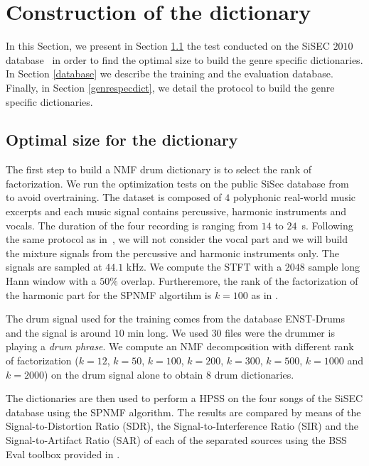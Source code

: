 \documentclass{article}
\begin{document}
\section{Construction of the dictionary}\label{ConstrucDict}

In this Section, we present in Section \ref{optimalsize} the test conducted on the SiSEC $2010$ database~\cite{SiSec10} in order to find the optimal size to build the genre specific dictionaries. In Section \ref{database} we describe the training and the evaluation database. Finally, in Section \ref{genrespecdict}, we detail the protocol to build the genre specific dictionaries. 

\subsection{Optimal size for the dictionary}\label{optimalsize}

The first step to build a NMF drum dictionary is to select the rank of factorization. We run the optimization tests on the public SiSec database from~\cite{SiSec10} to avoid overtraining. The dataset is composed of $4$ polyphonic real-world music excerpts and each music signal contains percussive, harmonic instruments and vocals. The duration of the four recording is ranging from $14$ to $24$~s. Following the same protocol as in~\cite{canadas2014percussive}, we will not consider the vocal part and we will build the mixture signals from the percussive and harmonic instruments only. The signals are sampled at $44.1$ kHz. We compute the STFT with a $2048$ sample long Hann window with a $50\%$ overlap. Furtheremore, the rank of the factorization of the harmonic part for the SPNMF algortihm is $k=100$ as in \cite{larocheJournal}.

The drum signal used for the training comes from the database ENST-Drums \cite{gillet2006enst} and the signal is around $10$ min long. We used $30$ files were the drummer is playing a \emph{drum phrase}. We compute an NMF decomposition with different rank of factorization ($k=12$, $k=50$, $k=100$, $k=200$, $k=300$, $k=500$, $k=1000$ and $k=2000$) on the drum signal alone to obtain $8$ drum dictionaries.

The dictionaries are then used to perform a HPSS on the four songs of the SiSEC database using the SPNMF algorithm. The results are compared by means of the Signal-to-Distortion Ratio (SDR), the Signal-to-Interference Ratio (SIR) and the Signal-to-Artifact Ratio (SAR) of each of the separated sources using the BSS Eval toolbox provided in \cite{bsseval}.
\end{document}
